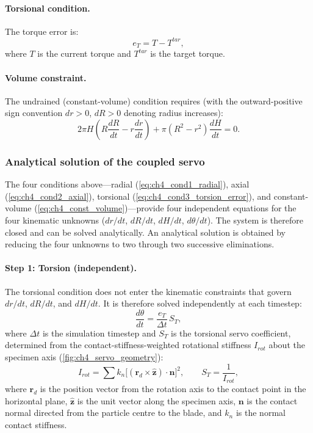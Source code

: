 \documentclass[../main]{subfiles}
\begin{document}
\paragraph{Torsional condition.}
The torque error is:
\begin{equation}
e_T = T - T^{tar},
\label{eq:ch4_cond3_torsion_error}
\end{equation}
where $T$ is the current torque and $T^{tar}$ is the target torque.

\paragraph{Volume constraint.}
The undrained (constant-volume) condition requires (with the outward-positive sign convention $dr>0$, $dR>0$ denoting radius increases):
\begin{equation}
2\pi H\!\left(R\frac{dR}{dt} - r\frac{dr}{dt}\right) + \pi\!\left(R^2-r^2\right)\frac{dH}{dt} = 0.
\label{eq:ch4_const_volume}
\end{equation}

\subsubsection{Analytical solution of the coupled servo}

The four conditions above---radial (\cref{eq:ch4_cond1_radial}), axial (\cref{eq:ch4_cond2_axial}), torsional (\cref{eq:ch4_cond3_torsion_error}), and constant-volume (\cref{eq:ch4_const_volume})---provide four independent equations for the four kinematic unknowns ($dr/dt$, $dR/dt$, $dH/dt$, $d\theta/dt$). The system is therefore closed and can be solved analytically. An analytical solution is obtained by reducing the four unknowns to two through two successive eliminations.

\paragraph{Step 1: Torsion (independent).}
The torsional condition does not enter the kinematic constraints that govern $dr/dt$, $dR/dt$, and $dH/dt$. It is therefore solved independently at each timestep:
\begin{equation}
\frac{d\theta}{dt} = \frac{e_T}{\Delta t}\,S_T,
\label{eq:ch4_torsion_servo}
\end{equation}
where $\Delta t$ is the simulation timestep and $S_T$ is the torsional servo coefficient, determined from the contact-stiffness-weighted rotational stiffness $I_{rot}$ about the specimen axis (\cref{fig:ch4_servo_geometry}):
\begin{equation}
I_{rot} = \sum k_n\bigl[(\mathbf{r}_d\times\hat{\mathbf{z}})\cdot\mathbf{n}\bigr]^2, \qquad S_T = \frac{1}{I_{rot}},
\label{eq:ch4_irot}
\end{equation}
where $\mathbf{r}_d$ is the position vector from the rotation axis to the contact point in the horizontal plane, $\hat{\mathbf{z}}$ is the unit vector along the specimen axis, $\mathbf{n}$ is the contact normal directed from the particle centre to the blade, and $k_n$ is the normal contact stiffness.
\end{document}
